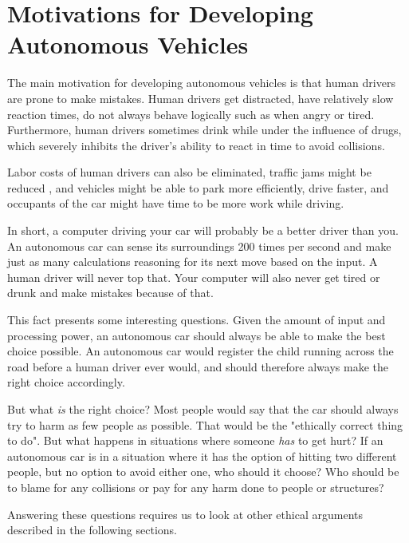 \section{Motivations for Developing Autonomous Vehicles}
The main motivation for developing autonomous vehicles is that human drivers are prone to make mistakes. Human drivers get distracted, have relatively slow reaction times, do not always behave logically such as when angry or tired. Furthermore, human drivers sometimes drink while under the influence of drugs, which severely inhibits the driver's ability to react in time to avoid collisions. 

Labor costs of human drivers can also be eliminated, traffic jams might be reduced , and vehicles might be able to park more efficiently, drive faster, and occupants of the car might have time to be more work while driving. 

\newpar In short, a computer driving your car will probably be a better driver than you. An autonomous car can sense its surroundings 200 times per second and make just as many calculations reasoning for its next move based on the input. A human driver will never top that. Your computer will also never get tired or drunk and make mistakes because of that. 

This fact presents some interesting questions. Given the amount of input and processing power, an autonomous car should always be able to make the best choice possible. An autonomous car would register the child running across the road before a human driver ever would, and should therefore always make the right choice accordingly. 

\newpar But what \textit{is} the right choice? Most people would say that the car should always try to harm as few people as possible. That would be the "ethically correct thing to do". But what happens in situations where someone \textit{has} to get hurt? If an autonomous car is in a situation where it has the option of hitting two different people, but no option to avoid either one, who should it choose? Who should be to blame for any collisions or pay for any harm done to people or structures? 

Answering these questions requires us to look at other ethical arguments described in the following sections.   